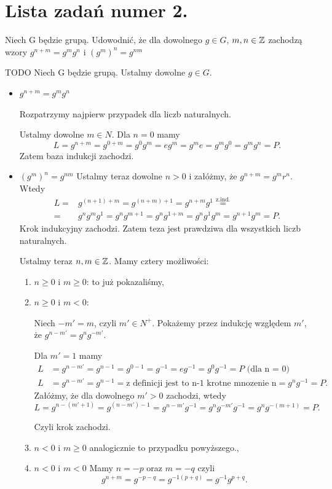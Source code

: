 \section{Lista zadań numer 2.}
\begin{problem}[1]

	Niech G będzie grupą. Udowodnić, że dla dowolnego $g\in G$, $m,n \in \mathbb{Z}$ zachodzą wzory $g^{n+m} = g^{m}g^{n}$ i $\left( g^{m} \right)^{n} = g^{nm}$
\end{problem}
\begin{solution}
	TODO
	Niech G będzie grupą. Ustalmy dowolne $g\in G$.
\begin{itemize}
	\item $g^{n+m} = g^{m}g^{n}$ 

		Rozpatrzymy najpierw przypadek dla liczb naturalnych.

		Ustalmy dowolne $m \in N$.
		Dla $n=0$ mamy
		 \[
			 L = g^{n+m} = g^{0+m} = g^{0}g^{m} = eg^{m} = g^{m}e= g^{m}g^{0} = g^{m}g^{n} = P
		.\] 
		Zatem baza indukcji zachodzi.
	\item  $\left( g^{m} \right)^{n} = g^{nm}$
		Ustalmy teraz dowolne $n>0$ i załóżmy, że $g^{n+m} = g^{m}r^{n}$.
                Wtedy
		\begin{align*}
			L =& g^{(n+1) + m} = g^{(n+m) + 1} = g^{n+m}g^{1}  \overset{\text{z.ind.}}{=} \\ =& g^{n}g^{m}g^{1} = g^{n}g^{m+1} =g^{n}g^{1+m} = g^{n}g^{1}g^{m} = g^{n+1}g^{m} = P 
		.\end{align*}
		Krok indukcyjny zachodzi. Zatem  teza jest prawdziwa dla wszystkich liczb naturalnych.

		Ustalmy teraz $n,m\in \mathbb{Z}$. 
		Mamy cztery możliwości:
		\begin{enumerate}
			\item $n \ge 0$ i $m\ge 0$: to już pokazaliśmy,
			\item $n \ge 0$ i $m<0$:

				Niech $-m' = m$, czyli  $m' \in N^{+}$. Pokażemy przez indukcję względem $m'$, że  $g^{n-m'} = g^{n}g^{-m'}$.

				Dla $m' = 1$ mamy
				 \begin{align*}
					 L & = g^{n-m'} = g^{n-1} = g^{0-1} = g^{-1} = eg^{-1} = g^{0}g^{-1} = P \text{ (dla n = 0)} \\
					 L & = g^{n-m'} = g^{n-1} = \text{z definicji jest to n-1 krotne mnozenie n} = g^{n}g^{-1} = P 
				 .\end{align*}
				 Załóżmy, że dla dowolnego $m' > 0$ zachodzi, wtedy
				 \[
				 L = g^{n-(m'+1)} = g^{(n-m') - 1} = g^{n-m'}g^{-1}= g^{n}g^{-m'}g^{-1} = g^{n}g^{-(m+1)} = P
				 .\] 

				Czyli krok zachodzi.
		        \item $n<0$ i  $m\ge 0$ analogicznie to przypadku powyższego.,
			\item $n<0$ i  $m<0$ 
				Mamy $n = -p$ oraz $m = -q$
				czyli \[
				g ^{n+m} = g^{-p-q} = g^{-1(p+q)} = g^{-1}g^{p+q}
				.\] 
		\end{enumerate}

\end{itemize}
\end{solution}

